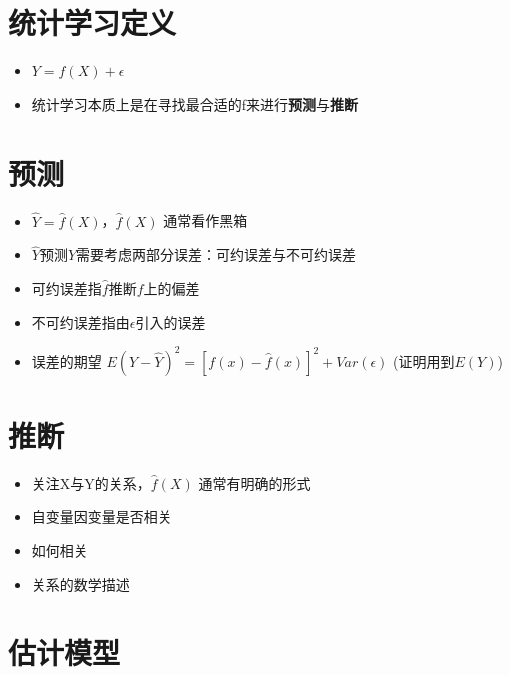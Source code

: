 \documentclass[
]{book}
\providecommand{\tightlist}{%
  \setlength{\itemsep}{0pt}\setlength{\parskip}{0pt}}
\begin{document}
\hypertarget{ux7edfux8ba1ux5b66ux4e60ux5b9aux4e49}{%
\section{统计学习定义}\label{ux7edfux8ba1ux5b66ux4e60ux5b9aux4e49}}

\begin{itemize}
\tightlist
\item
  \(Y = f(X) + \epsilon\)
\item
  统计学习本质上是在寻找最合适的f来进行\textbf{预测}与\textbf{推断}
\end{itemize}

\hypertarget{ux9884ux6d4b}{%
\section{预测}\label{ux9884ux6d4b}}

\begin{itemize}
\tightlist
\item
  \(\hat Y = \hat f(X)\)，\(\hat f(X)\) 通常看作黑箱
\item
  \(\hat Y\)预测\(Y\)需要考虑两部分误差：可约误差与不可约误差
\item
  可约误差指\(\hat f\)推断\(f\)上的偏差
\item
  不可约误差指由\(\epsilon\)引入的误差
\item
  误差的期望 \(E(Y - \hat Y)^2 = [f(x) - \hat f(x)]^2 + Var(\epsilon)\) (证明用到\(E(Y)\))
\end{itemize}

\hypertarget{ux63a8ux65ad}{%
\section{推断}\label{ux63a8ux65ad}}

\begin{itemize}
\tightlist
\item
  关注X与Y的关系，\(\hat f(X)\) 通常有明确的形式
\item
  自变量因变量是否相关
\item
  如何相关
\item
  关系的数学描述
\end{itemize}

\hypertarget{ux4f30ux8ba1ux6a21ux578b}{%
\section{估计模型}\label{ux4f30ux8ba1ux6a21ux578b}}
\end{document}
